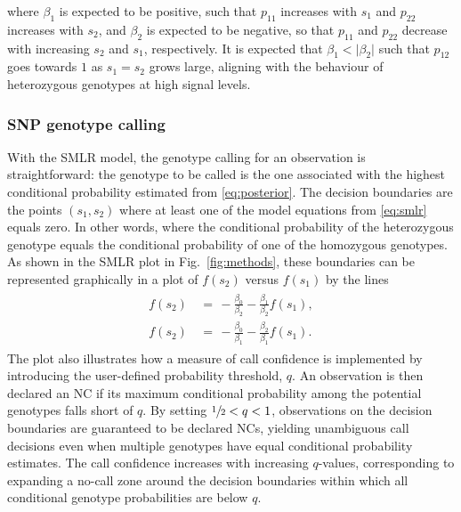 \documentclass[preprint,5p,times,11pt]{elsarticle}
\begin{document}
where $\beta_1$ is expected to be positive, such that $p_{11}$ increases with $s_1$ and $p_{22}$ increases with $s_2$, and $\beta_2$ is expected to be negative, so that $p_{11}$ and $p_{22}$ decrease with increasing $s_2$ and $s_1$, respectively.
It is expected that $\beta_1 < \lvert \beta_2 \rvert$ such that $p_{12}$ goes towards $1$ as $s_1 = s_2$ grows large, aligning with the behaviour of heterozygous genotypes at high signal levels.


\subsubsection{SNP genotype calling}
With the SMLR model, the genotype calling for an observation is straightforward: the genotype to be called is the one associated with the highest conditional probability estimated from \eqref{eq:posterior}.
The decision boundaries are the points $\left(s_1, s_2\right)$ where at least one of the model equations from \eqref{eq:smlr} equals zero.
In other words, where the conditional probability of the heterozygous genotype equals the conditional probability of one of the homozygous genotypes.
As shown in the SMLR plot in Fig.~\ref{fig:methods}, these boundaries can be represented graphically in a plot of $f\left(s_2\right)$ versus $f\left(s_1\right)$ by the lines
\begin{align}\label{eq:boundaries}
\begin{split}
f\left(s_2\right) \, &= \, -\frac{\beta_0}{\beta_2} - \frac{\beta_1}{\beta_2} f\left(s_1\right), \\
f\left(s_2\right) \, &= \, -\frac{\beta_0}{\beta_1} - \frac{\beta_2}{\beta_1} f\left(s_1\right).
\end{split}
\end{align}
The plot also illustrates how a measure of call confidence is implemented by introducing the user-defined probability threshold, $q$.
An observation is then declared an NC if its maximum conditional probability among the potential genotypes falls short of $q$.
By setting $\sfrac{1}{2} < q < 1$, observations on the decision boundaries are guaranteed to be declared NCs, yielding unambiguous call decisions even when multiple genotypes have equal conditional probability estimates.
The call confidence increases with increasing $q$-values, corresponding to expanding a no-call zone around the decision boundaries within which all conditional genotype probabilities are below $q$.
\end{document}
